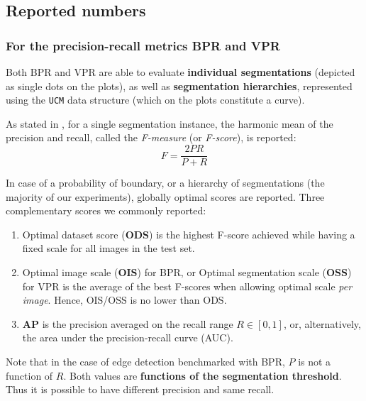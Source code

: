 \subsection{Reported numbers}
\subsubsection*{For the precision-recall metrics BPR and VPR}
Both BPR and VPR are able to evaluate {\bf individual segmentations} (depicted as single dots on the plots), %
as well as {\bf segmentation hierarchies}, represented using the {\tt UCM} data structure (which on the plots constitute a curve). 

As stated in , for a single segmentation instance, the harmonic mean of the precision and recall, called the {\it F-measure} (or {\it F-score}), is 
reported: %
\begin{equation}
F=\frac{2PR}{P+R}
\end{equation}


In case of a probability of boundary, or a hierarchy of segmentations (the majority of our experiments), globally optimal scores %
are reported. %
Three complementary scores we commonly reported:

\begin{enumerate}
 \item Optimal dataset score ({\bf ODS}) is the highest F-score achieved while having a fixed scale for all images in the test set. 
 \item Optimal image scale ({\bf OIS}) for BPR, or Optimal segmentation scale (\textbf{OSS}) for VPR is the average of the best F-scores when allowing optimal scale {\it per image}. Hence, OIS\slash OSS is no lower than ODS. 
 \item {\bf AP} is the precision averaged on the recall range $R\in[0,1]$, or, alternatively, the area under the precision-recall curve (AUC).
\end{enumerate}

Note that in the case of edge detection benchmarked with BPR, $P$ is not a function of $R$. Both values are {\bf functions of the segmentation threshold}. Thus it is possible to have different precision and same recall. %

